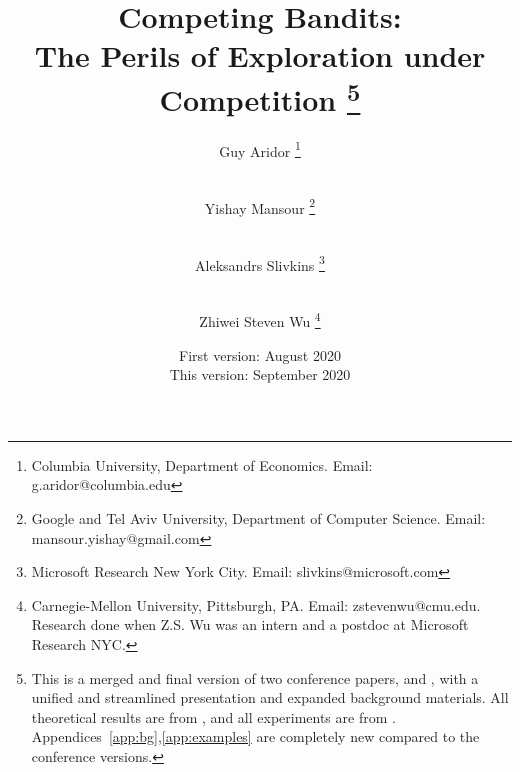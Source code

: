 \documentclass[12pt]{article}
\begin{document}

\title{\vspace{-12mm}Competing Bandits:\\
The Perils of Exploration under Competition%
\thanks{This is a merged and final version of two conference papers,
\citet{CompetingBandits-itcs18} and \citet{CompetingBandits-ec19},
with a unified and streamlined presentation and expanded background materials. All theoretical results are from \citet{CompetingBandits-itcs18}, and all experiments are from \citet{CompetingBandits-ec19}. Appendices~\ref{app:bg},\ref{app:examples} are completely new compared to the conference versions.}}

\author{Guy Aridor%
\footnote{Columbia University, Department of Economics. Email: g.aridor@columbia.edu}
\and
\rule{0.2in}{0pt}
Yishay Mansour%
\footnote{Google and Tel Aviv University, Department of Computer Science. Email: mansour.yishay@gmail.com}
\and
\rule{0.2in}{0pt}
Aleksandrs Slivkins%
\footnote{Microsoft Research New York City. Email: slivkins@microsoft.com}
\and
\rule{0.2in}{0pt}
Zhiwei Steven Wu%
\footnote{Carnegie-Mellon University, Pittsburgh, PA.
Email: zstevenwu@cmu.edu.\newline
Research done when Z.S. Wu was an intern and a postdoc at Microsoft Research NYC.}
}
\date{First version: August 2020\\ This version: September 2020}

\maketitle
\end{document}
